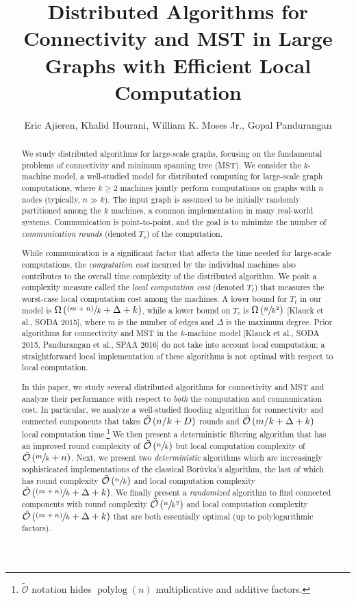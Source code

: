 \documentclass[final]{article}
\title{Distributed Algorithms for Connectivity and MST in Large Graphs with Efficient Local Computation}
\author{Eric Ajieren, Khalid Hourani, William K. Moses Jr., Gopal Pandurangan}
\date{}
\begin{document}
\maketitle
\begin{abstract}
    We study distributed algorithms for large-scale graphs, focusing on the
    fundamental problems of connectivity and minimum spanning tree (MST). We
    consider the \(k\)-machine model, a well-studied model for distributed
    computing for large-scale graph computations, where \(k \geq 2\) machines
    jointly perform computations on graphs with \(n\) nodes (typically, \(n \gg
    k\)). The input graph is assumed to be initially randomly partitioned among
    the \(k\) machines, a common implementation in many real-world systems.
    Communication is point-to-point, and the goal is to minimize the number of
    \emph{communication rounds} (denoted \(T_c\)) of the computation.

    While communication is a significant factor that affects the time needed for
    large-scale computations, the \emph{computation cost} incurred by the
    individual machines also contributes to the overall time complexity of the
    distributed algorithm. We posit a complexity measure called the \emph{local
    computation cost} (denoted \(T_{\ell}\)) that measures the worst-case local
    computation cost among the machines.  A lower bound for \(T_{\ell}\)
	in our model is \(\Omega\left(\sfrac{(m+n)}{k} + \Delta + k\right)\), while a
    lower bound on \(T_c\) is \(\Omega\left(\sfrac{n}{k^2}\right)\) [Klauck et al., SODA 2015],
    where $m$ is the number of edges and $\Delta$ is the maximum degree. Prior
    algorithms for connectivity and MST in the $k$-machine model [Klauck et al.,
    SODA 2015, Pandurangan et al., SPAA 2016] do not take into account local
    computation; a straightforward local implementation of these algorithms is
    not optimal with respect to local computation.

    In this paper, we study several distributed algorithms for connectivity and
    MST and analyze their performance with respect to \emph{both} the computation and
    communication cost. In particular, we analyze a well-studied flooding
    algorithm for connectivity and connected components that takes
    \(\tilde{\mathcal{O}}\left(n/k + D\right)\) rounds and \(\tilde{\mathcal{O}}\left(m / k + \Delta + k\right)\)
    local computation time.\footnote{\(\tilde{\mathcal{O}}\) notation hides
    \(\operatorname{polylog}(n)\) multiplicative and additive factors.} We then
    present a deterministic filtering algorithm that has an improved
    round complexity of \(\tilde{\mathcal{O}}\left(\sfrac{n}{k}\right)\) but local computation
    complexity of \(\tilde{\mathcal{O}}\left(\sfrac{m}{k} + n\right)\). Next, we present two
    \emph{deterministic} algorithms which are increasingly sophisticated
    implementations of the classical Bor\r{u}vka's algorithm, the last of which
    has round complexity \(\tilde{\mathcal{O}}\left(\sfrac{n}{k}\right)\) and local computation
    complexity \(\tilde{\mathcal{O}}\left(\sfrac{(m + n)}{k} + \Delta + k\right)\). We finally
    present a \emph{randomized} algorithm to find connected components with
    round complexity \(\tilde{\mathcal{O}}\left(\sfrac{n}{k^2}\right)\) and local computation
    complexity \(\tilde{\mathcal{O}}\left(\sfrac{(m + n)}{k} + \Delta + k\right)\) that are
    both essentially optimal (up to polylogarithmic factors).
\end{abstract}










\end{document}
